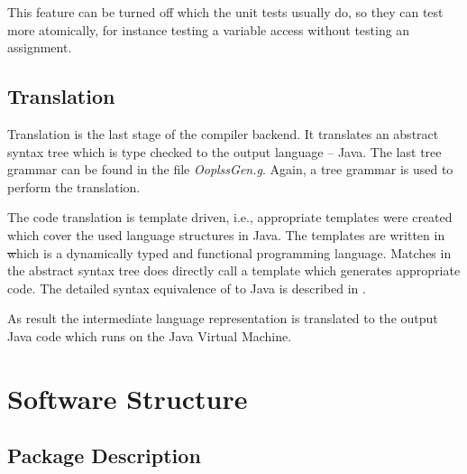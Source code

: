 This feature can be turned off which the unit tests usually do, so
they can test more atomically, for instance testing a variable
access without testing an assignment.

\subsection{Translation}
Translation is the last stage of the compiler backend. It
translates an abstract syntax tree which is type checked to the
output language -- Java. The last tree grammar can be found in the
file \emph{OoplssGen.g}. Again, a tree grammar is used to perform the
translation.

The code translation is template driven, i.e., appropriate templates
were created which cover the used language structures in Java. The
templates are written in \st which is a dynamically typed and functional
programming language. Matches in the abstract syntax tree does directly
call a template which generates appropriate code. The detailed syntax
equivalence of \ooplss to Java is described in .

As result the intermediate language representation is translated to the
output Java code which runs on the Java Virtual Machine.

\section{Software Structure}

\subsection{Package Description}

